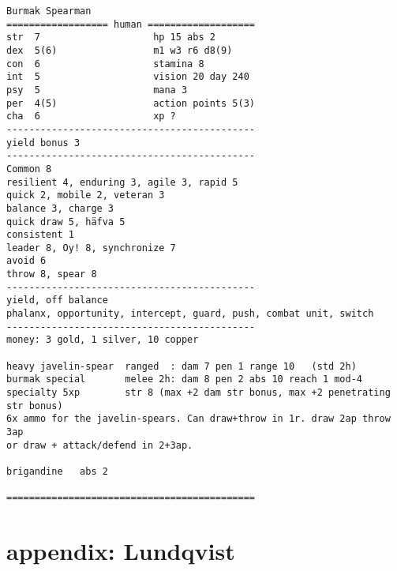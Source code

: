 \goodbreak \small \begin{samepage} \begin{verbatim}
Burmak Spearman
================== human ===================
str  7                    hp 15 abs 2
dex  5(6)                 m1 w3 r6 d8(9)
con  6                    stamina 8
int  5                    vision 20 day 240
psy  5                    mana 3
per  4(5)                 action points 5(3)
cha  6                    xp ?
--------------------------------------------
yield bonus 3
--------------------------------------------
Common 8
resilient 4, enduring 3, agile 3, rapid 5
quick 2, mobile 2, veteran 3
balance 3, charge 3
quick draw 5, häfva 5
consistent 1
leader 8, Oy! 8, synchronize 7
avoid 6
throw 8, spear 8
--------------------------------------------
yield, off balance
phalanx, opportunity, intercept, guard, push, combat unit, switch
--------------------------------------------
money: 3 gold, 1 silver, 10 copper

heavy javelin-spear  ranged  : dam 7 pen 1 range 10   (std 2h)
burmak special       melee 2h: dam 8 pen 2 abs 10 reach 1 mod-4
specialty 5xp        str 8 (max +2 dam str bonus, max +2 penetrating str bonus)
6x ammo for the javelin-spears. Can draw+throw in 1r. draw 2ap throw 3ap
or draw + attack/defend in 2+3ap.
        
brigandine   abs 2

============================================
\end{verbatim} \end{samepage} \normalsize

\flushbottom





























\newpage
\section*{appendix: Lundqvist}

